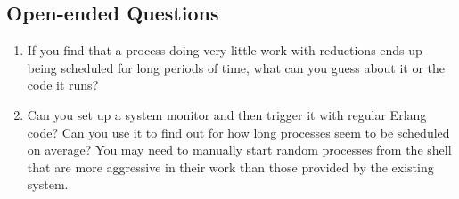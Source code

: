 \documentclass[11pt, oneside]{book}   	%
\begin{document}
\subsection*{Open-ended Questions}

\begin{enumerate}
	\item If you find that a process doing very little work with reductions ends up being scheduled for long periods of time, what can you guess about it or the code it runs?
	\item Can you set up a system monitor and then trigger it with regular Erlang code? Can you use it to find out for how long processes seem to be scheduled on average? You may need to manually start random processes from the shell that are more aggressive in their work than those provided by the existing system.
\end{enumerate}


\end{document}
